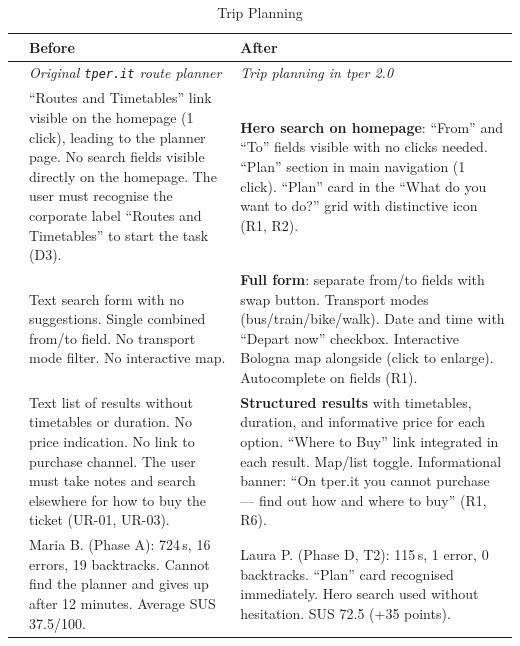 \begin{table}[H]
\centering
\small
\renewcommand{\arraystretch}{1.4}
\begin{tabular}{|p{0.5cm}|p{7cm}|p{7cm}|}
\hline
& \textbf{Before} & \textbf{After} \\ \hline
\cellcolor{primaryColor!15} &
\textit{Original \texttt{tper.it} route planner} &
\textit{Trip planning in tper 2.0} \\ \hline

\raisebox{0.5cm}{\rotatebox{90}{\textbf{Access}}} &
``Routes and Timetables'' link visible on the homepage (1 click), leading to the planner page. No search fields visible directly on the homepage. The user must recognise the corporate label ``Routes and Timetables'' to start the task (D3). &
\textbf{Hero search on homepage}: ``From'' and ``To'' fields visible with no clicks needed. ``Plan'' section in main navigation (1 click). ``Plan'' card in the ``What do you want to do?'' grid with distinctive icon (R1, R2). \\ \hline

\raisebox{0.5cm}{\rotatebox{90}{\textbf{Form}}} &
Text search form with no suggestions. Single combined from/to field. No transport mode filter. No interactive map. &
\textbf{Full form}: separate from/to fields with swap button. Transport modes (bus/train/bike/walk). Date and time with ``Depart now'' checkbox. Interactive Bologna map alongside (click to enlarge). Autocomplete on fields (R1). \\ \hline

\raisebox{0.5cm}{\rotatebox{90}{\textbf{Results}}} &
Text list of results without timetables or duration. No price indication. No link to purchase channel. The user must take notes and search elsewhere for how to buy the ticket (UR-01, UR-03). &
\textbf{Structured results} with timetables, duration, and informative price for each option. ``Where to Buy'' link integrated in each result. Map/list toggle. Informational banner: ``On tper.it you cannot purchase --- find out how and where to buy'' (R1, R6). \\ \hline

\raisebox{0.5cm}{\rotatebox{90}{\textbf{Impact}}} &
Maria B. (Phase A): 724\,s, 16 errors, 19 backtracks. Cannot find the planner and gives up after 12 minutes. Average SUS 37.5/100. &
Laura P. (Phase D, T2): 115\,s, 1 error, 0 backtracks. ``Plan'' card recognised immediately. Hero search used without hesitation. SUS 72.5 (+35 points). \\ \hline
\end{tabular}
\caption{Trip Planning}
\label{tab:comparison-planning}
\end{table}

